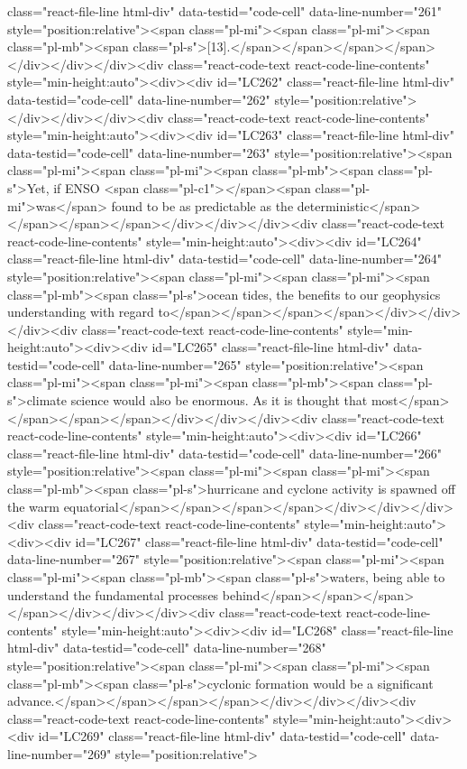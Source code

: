 {{{class="react-file-line html-div" data-testid="code-cell" data-line-number="261" style="position:relative"><span class="pl-mi"><span class="pl-mi"><span class="pl-mb"><span class="pl-s">{[}13{]}.</span></span></span></span></div></div></div><div class="react-code-text react-code-line-contents" style="min-height:auto"><div><div id="LC262" class="react-file-line html-div" data-testid="code-cell" data-line-number="262" style="position:relative">
</div></div></div><div class="react-code-text react-code-line-contents" style="min-height:auto"><div><div id="LC263" class="react-file-line html-div" data-testid="code-cell" data-line-number="263" style="position:relative"><span class="pl-mi"><span class="pl-mi"><span class="pl-mb"><span class="pl-s">Yet, if ENSO <span class="pl-c1">\emph</span>{<span class="pl-mi">was</span>} found to be as predictable as the deterministic</span></span></span></span></div></div></div><div class="react-code-text react-code-line-contents" style="min-height:auto"><div><div id="LC264" class="react-file-line html-div" data-testid="code-cell" data-line-number="264" style="position:relative"><span class="pl-mi"><span class="pl-mi"><span class="pl-mb"><span class="pl-s">ocean tides, the benefits to our geophysics understanding with regard to</span></span></span></span></div></div></div><div class="react-code-text react-code-line-contents" style="min-height:auto"><div><div id="LC265" class="react-file-line html-div" data-testid="code-cell" data-line-number="265" style="position:relative"><span class="pl-mi"><span class="pl-mi"><span class="pl-mb"><span class="pl-s">climate science would also be enormous. As it is thought that most</span></span></span></span></div></div></div><div class="react-code-text react-code-line-contents" style="min-height:auto"><div><div id="LC266" class="react-file-line html-div" data-testid="code-cell" data-line-number="266" style="position:relative"><span class="pl-mi"><span class="pl-mi"><span class="pl-mb"><span class="pl-s">hurricane and cyclone activity is spawned off the warm equatorial</span></span></span></span></div></div></div><div class="react-code-text react-code-line-contents" style="min-height:auto"><div><div id="LC267" class="react-file-line html-div" data-testid="code-cell" data-line-number="267" style="position:relative"><span class="pl-mi"><span class="pl-mi"><span class="pl-mb"><span class="pl-s">waters, being able to understand the fundamental processes behind</span></span></span></span></div></div></div><div class="react-code-text react-code-line-contents" style="min-height:auto"><div><div id="LC268" class="react-file-line html-div" data-testid="code-cell" data-line-number="268" style="position:relative"><span class="pl-mi"><span class="pl-mi"><span class="pl-mb"><span class="pl-s">cyclonic formation would be a significant advance.</span></span></span></span></div></div></div><div class="react-code-text react-code-line-contents" style="min-height:auto"><div><div id="LC269" class="react-file-line html-div" data-testid="code-cell" data-line-number="269" style="position:relative">
}}}
